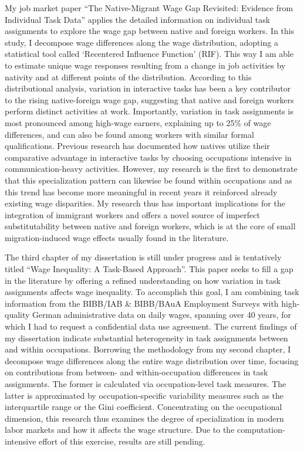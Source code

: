 \documentclass[a4paper,11pt]{article}
\begin{document}
My job market paper ``The Native-Migrant Wage Gap Revisited: Evidence from Individual Task Data'' applies the detailed information on individual task assignments to explore the wage gap between native and foreign workers. 
In this study, I decompose wage differences along the wage distribution, adopting a statistical tool called `Recentered Influence Function' (RIF). This way I am able to estimate unique wage responses resulting from a change in job activities by nativity and at different points of the distribution. According to this distributional analysis, variation in interactive tasks has been a key contributor to the rising native-foreign wage gap, suggesting that native and foreign workers perform distinct activities at work. Importantly, variation in task assignments is most pronounced among high-wage earners, explaining up to 25\% of wage differences, and can also be found among workers with similar formal qualifications. Previous research has documented how natives utilize their comparative advantage in interactive tasks by choosing occupations intensive in communication-heavy activities. However, my research is the first to demonstrate that this specialization pattern can likewise be found within occupations and as this trend has become more meaningful in recent years it reinforced already existing wage disparities. My research thus has important implications for the integration of immigrant workers and offers a novel source of imperfect substitutability between native and foreign workers, which is at the core of small migration-induced wage effects usually found in the literature. 

The third chapter of my dissertation is still under progress and is tentatively titled ``Wage Inequality: A Task-Based Approach''. This paper seeks to fill a gap in the literature by offering a refined understanding on how variation in task assignments affects wage inequality. To accomplish this goal, I am combining task information from the BIBB/IAB \& BIBB/BAuA Employment Surveys with high-quality German administrative data on daily wages, spanning over 40 years, for which I had to request a confidential data use agreement. The current findings of my dissertation indicate substantial heterogeneity in task assignments between and within occupations. Borrowing the methodology from my second chapter, I decompose wage differences along the entire wage distribution over time, focusing on contributions from between- and within-occupation differences in task assignments. The former is calculated via occupation-level task measures. The latter is approximated by occupation-specific variability measures such as the interquartile range or the Gini coefficient. Concentrating on the occupational dimension, this research thus examines the degree of specialization in modern labor markets and how it affects the wage structure. Due to the computation-intensive effort of this exercise, results are still pending. 
\end{document}
